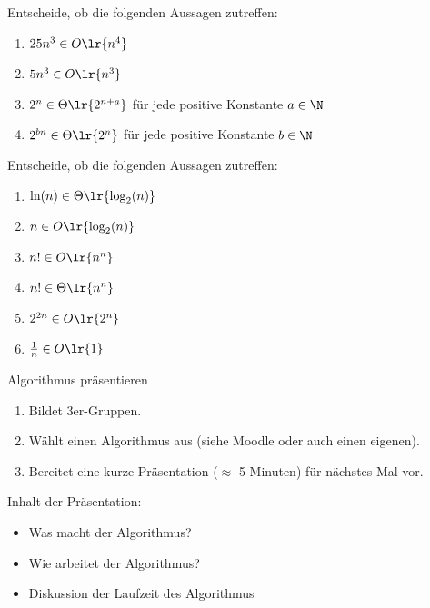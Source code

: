 \begin{frame}
	\begin{myexercise}\label{myexercise:complexity01}
		Entscheide, ob die folgenden Aussagen zutreffen:
		\begin{enumerate}
			\item $25n^3 \in O\lr{n^4}$
			\item $5n^3 \in O\lr{n^3}$
			\item $2^n \in \Theta\lr{2^{n + a}}$ für jede positive Konstante $a\in\N$
			\item $2^{bn} \in \Theta\lr{2^n}$ für jede positive Konstante $b\in\N$
		\end{enumerate}
	\end{myexercise}
\end{frame}

\begin{frame}
	\begin{myexercise}\label{myexercise:complexity02}
		Entscheide, ob die folgenden Aussagen zutreffen:
		\begin{enumerate}
			\item $\ln(n) \in \Theta\lr{\log_2(n)}$
			\item $n \in O\lr{\log_2(n)}$
			\item $n! \in O\lr{n^n}$
			\item $n! \in \Theta\lr{n^n}$
			\item $2^{2n} \in O\lr{2^n}$
			\item $\frac{1}{n} \in O\lr{1}$
		\end{enumerate}
	\end{myexercise}
\end{frame}

\begin{frame}{Algorithmus präsentieren}
	\begin{enumerate}
		\item Bildet 3er-Gruppen.
		\item Wählt einen Algorithmus aus (siehe Moodle oder auch einen eigenen).
		\item Bereitet eine kurze Präsentation ($\approx$ 5 Minuten) für nächstes Mal vor.
	\end{enumerate}

	Inhalt der Präsentation:
	\begin{itemize}
		\item Was macht der Algorithmus?
		\item Wie arbeitet der Algorithmus?
		\item Diskussion der Laufzeit des Algorithmus
	\end{itemize}
\end{frame}


